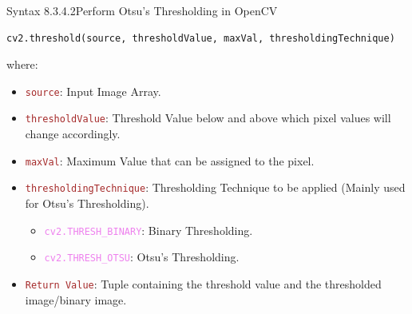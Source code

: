\documentclass{book}
\begin{document}
\begin{synBox}{Syntax 8.3.4.2}{Perform Otsu's Thresholding in OpenCV}
    \begin{lstlisting}[language=Python, basicstyle=\ttfamily\small, keywordstyle=\color{blue}, commentstyle=\color{forestgreen}, stringstyle=\color{red}, showstringspaces=false]
            cv2.threshold(source, thresholdValue, maxVal, thresholdingTechnique)
    \end{lstlisting}
    where:
    \begin{itemize}
        \item \textcolor{brown}{\texttt{source}}: Input Image Array.
        \item \textcolor{brown}{\texttt{thresholdValue}}: Threshold Value below and above which pixel values will change accordingly.
        \item \textcolor{brown}{\texttt{maxVal}}: Maximum Value that can be assigned to the pixel.
        \item \textcolor{brown}{\texttt{thresholdingTechnique}}: Thresholding Technique to be applied (Mainly used for Otsu's Thresholding).
        \begin{itemize}
            \item \textcolor{violet}{\texttt{cv2.THRESH\_BINARY}}: Binary Thresholding.
            \item \textcolor{violet}{\texttt{cv2.THRESH\_OTSU}}: Otsu's Thresholding.
        \end{itemize}
        \item \textcolor{brown}{\texttt{Return Value}}: Tuple containing the threshold value and the thresholded image/binary image.
    \end{itemize}
\end{synBox}
\end{document}
